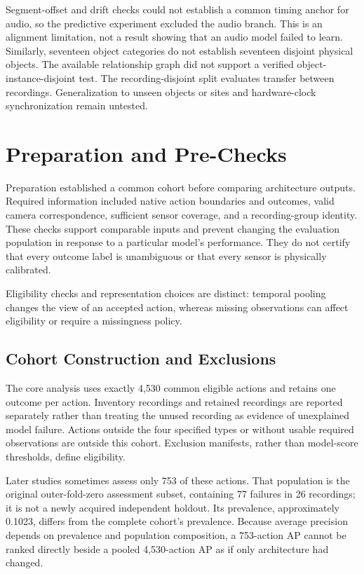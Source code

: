 Segment-offset and drift checks could not establish a common timing anchor for audio, so the predictive experiment excluded the audio branch. This is an alignment limitation, not a result showing that an audio model failed to learn. Similarly, seventeen object categories do not establish seventeen disjoint physical objects. The available relationship graph did not support a verified object-instance-disjoint test. The recording-disjoint split evaluates transfer between recordings. Generalization to unseen objects or sites and hardware-clock synchronization remain untested.

\section{Preparation and Pre-Checks}
Preparation established a common cohort before comparing architecture outputs. Required information included native action boundaries and outcomes, valid camera correspondence, sufficient sensor coverage, and a recording-group identity. These checks support comparable inputs and prevent changing the evaluation population in response to a particular model's performance. They do not certify that every outcome label is unambiguous or that every sensor is physically calibrated.

Eligibility checks and representation choices are distinct: temporal pooling changes the view of an accepted action, whereas missing observations can affect eligibility or require a missingness policy.

\subsection{Cohort Construction and Exclusions}
The core analysis uses exactly 4,530 common eligible actions and retains one outcome per action. Inventory recordings and retained recordings are reported separately rather than treating the unused recording as evidence of unexplained model failure. Actions outside the four specified types or without usable required observations are outside this cohort. Exclusion manifests, rather than model-score thresholds, define eligibility.

Later studies sometimes assess only 753 of these actions. That population is the original outer-fold-zero assessment subset, containing 77 failures in 26 recordings; it is not a newly acquired independent holdout. Its prevalence, approximately 0.1023, differs from the complete cohort's prevalence. Because average precision depends on prevalence and population composition, a 753-action AP cannot be ranked directly beside a pooled 4,530-action AP as if only architecture had changed.

